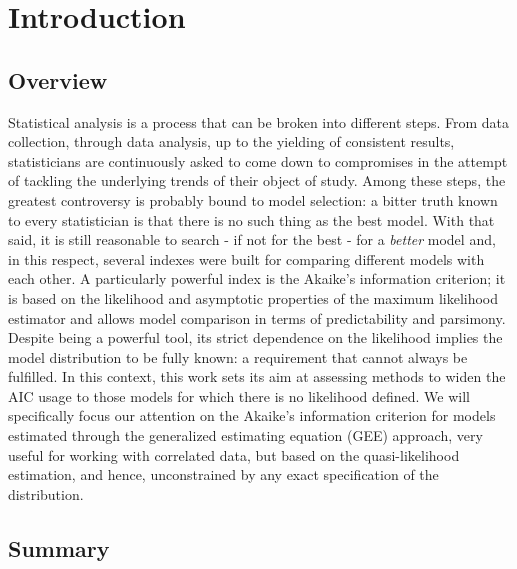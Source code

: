\chapter*{Introduction} %



\fancyhead[RO,LE]{\thepage}

\setlength{\parskip}{0.5pt}

\bigskip

\section*{Overview}
\large Statistical analysis is a process that can be broken into different steps. 
From data collection, through data analysis, up to the yielding of consistent results, statisticians are continuously asked to come down to compromises in the attempt of tackling the underlying trends of their object of study. 
Among these steps, the greatest controversy is probably bound to model selection: a bitter truth known to every statistician is that there is no such thing as the best model. With that said, it is still reasonable to search - if not for the best - for a \textit{better} model and, in this respect, several indexes were built for comparing different models with each other. %
A particularly powerful index is the Akaike's information criterion; it is based on the
likelihood and asymptotic properties of the maximum likelihood estimator and allows model comparison in terms of predictability and parsimony. %
Despite being a powerful tool, its strict dependence on the likelihood implies the model distribution to be fully known: a requirement that cannot always be fulfilled. In this context, this work sets its aim at assessing methods to widen the AIC usage to those models for which there is no likelihood defined. We will specifically focus our attention on the Akaike's information criterion for models estimated through the generalized estimating equation (GEE) approach, very useful for working with correlated data, but 
based on the quasi-likelihood estimation, and hence, unconstrained by any exact specification of the distribution. 
\noindent


{}
\newpage
\section*{Summary}

